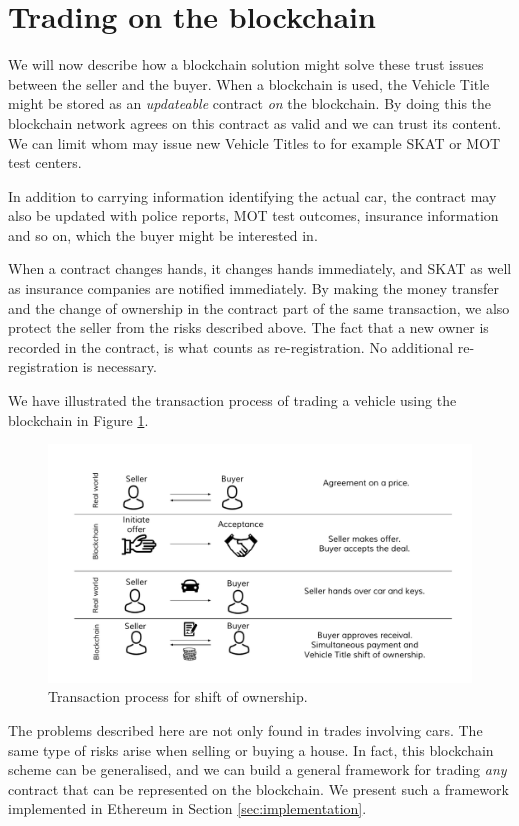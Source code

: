\documentclass[oneside,a4paper,10pts,article]{memoir}
\begin{document}
\section{Trading on the blockchain}
We will now describe how a blockchain solution might solve these trust
issues between the seller and the buyer. When a blockchain is used,
the Vehicle Title might be stored as an \emph{updateable} contract
\emph{on} the blockchain. By doing this the blockchain network agrees
on this contract as valid and we can trust its content. We can limit
whom may issue new Vehicle Titles to for example SKAT or MOT test
centers. 

In addition to carrying information identifying the actual car, the
contract may also be updated with police reports, MOT test outcomes,
insurance information and so on, which the buyer might be interested
in.

When a contract changes hands, it changes hands immediately, and SKAT
as well as insurance companies are notified immediately. By making the
money transfer and the change of ownership in the contract part of the
same transaction, we also protect the seller from the risks described
above. The fact that a new owner is recorded in the contract, is what
counts as re-registration. No additional re-registration is
necessary.

We have illustrated the transaction process of trading a vehicle using
the blockchain in Figure \ref{fig:shift-of-ownership}.

\begin{figure}
  \centering
  \includegraphics[width=\textwidth]{shift-of-ownership.pdf}
  \caption{Transaction process for shift of ownership.}
  \label{fig:shift-of-ownership}
\end{figure}

The problems described here are not only found in trades involving
cars. The same type of risks arise when selling or buying a house. In
fact, this blockchain scheme can be generalised, and we can build a
general framework for trading \textit{any} contract that can be
represented on the blockchain. We present such a framework implemented
in Ethereum in Section \ref{sec:implementation}.
\end{document}
